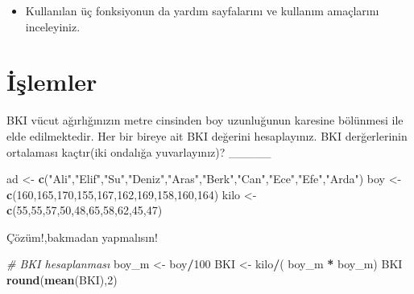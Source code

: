 \documentclass[
  oneside]{book}
\newenvironment{Shaded}{\begin{snugshade}}{\end{snugshade}}
\newcommand{\CommentTok}[1]{\textcolor[rgb]{0.56,0.35,0.01}{\textit{#1}}}
\newcommand{\DecValTok}[1]{\textcolor[rgb]{0.00,0.00,0.81}{#1}}
\newcommand{\FunctionTok}[1]{\textcolor[rgb]{0.13,0.29,0.53}{\textbf{#1}}}
\newcommand{\NormalTok}[1]{#1}
\newcommand{\OtherTok}[1]{\textcolor[rgb]{0.56,0.35,0.01}{#1}}
\newcommand{\SpecialCharTok}[1]{\textcolor[rgb]{0.81,0.36,0.00}{\textbf{#1}}}
\newcommand{\StringTok}[1]{\textcolor[rgb]{0.31,0.60,0.02}{#1}}
\providecommand{\tightlist}{%
  \setlength{\itemsep}{0pt}\setlength{\parskip}{0pt}}
\begin{document}
\begin{itemize}
\tightlist
\item
  Kullanılan üç fonksiyonun da yardım sayfalarını ve kullanım amaçlarını inceleyiniz.
\end{itemize}

\hypertarget{iux15flemler-1}{%
\section{İşlemler}\label{iux15flemler-1}}

BKI vücut ağırlığınızın metre cinsinden boy uzunluğunun karesine bölünmesi ile elde edilmektedir. Her bir bireye ait BKI değerini hesaplayınız. BKI derğerlerinin ortalaması kaçtır(iki ondalığa yuvarlayınız)? \_\_\_\_\_

\begin{Shaded}
\begin{Highlighting}[]
\NormalTok{ad  }\OtherTok{\textless{}{-}}  \FunctionTok{c}\NormalTok{(}\StringTok{"Ali"}\NormalTok{,}\StringTok{"Elif"}\NormalTok{,}\StringTok{"Su"}\NormalTok{,}\StringTok{"Deniz"}\NormalTok{,}\StringTok{"Aras"}\NormalTok{,}\StringTok{"Berk"}\NormalTok{,}\StringTok{"Can"}\NormalTok{,}\StringTok{"Ece"}\NormalTok{,}\StringTok{"Efe"}\NormalTok{,}\StringTok{"Arda"}\NormalTok{)}
\NormalTok{boy }\OtherTok{\textless{}{-}} \FunctionTok{c}\NormalTok{(}\DecValTok{160}\NormalTok{,}\DecValTok{165}\NormalTok{,}\DecValTok{170}\NormalTok{,}\DecValTok{155}\NormalTok{,}\DecValTok{167}\NormalTok{,}\DecValTok{162}\NormalTok{,}\DecValTok{169}\NormalTok{,}\DecValTok{158}\NormalTok{,}\DecValTok{160}\NormalTok{,}\DecValTok{164}\NormalTok{)}
\NormalTok{kilo }\OtherTok{\textless{}{-}} \FunctionTok{c}\NormalTok{(}\DecValTok{55}\NormalTok{,}\DecValTok{55}\NormalTok{,}\DecValTok{57}\NormalTok{,}\DecValTok{50}\NormalTok{,}\DecValTok{48}\NormalTok{,}\DecValTok{65}\NormalTok{,}\DecValTok{58}\NormalTok{,}\DecValTok{62}\NormalTok{,}\DecValTok{45}\NormalTok{,}\DecValTok{47}\NormalTok{)}
\end{Highlighting}
\end{Shaded}

Çözüm!,bakmadan yapmalısın!

\begin{Shaded}
\begin{Highlighting}[]
\CommentTok{\# BKI  hesaplanması}
\NormalTok{boy\_m  }\OtherTok{\textless{}{-}}\NormalTok{ boy}\SpecialCharTok{/}\DecValTok{100}
\NormalTok{BKI }\OtherTok{\textless{}{-}}\NormalTok{ kilo}\SpecialCharTok{/}\NormalTok{( boy\_m }\SpecialCharTok{*}\NormalTok{ boy\_m)}
\NormalTok{BKI}
\FunctionTok{round}\NormalTok{(}\FunctionTok{mean}\NormalTok{(BKI),}\DecValTok{2}\NormalTok{)}
\end{Highlighting}
\end{Shaded}
\end{document}
